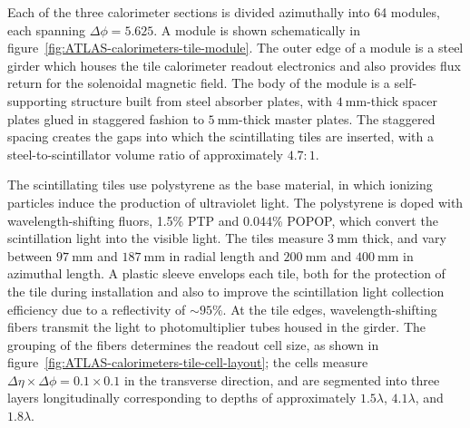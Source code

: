 Each of the three calorimeter sections is divided azimuthally into 64 modules, each spanning $\Delta\phi=5.625$. A module is shown schematically in figure~\ref{fig:ATLAS-calorimeters-tile-module}. The outer edge of a module is a steel girder which houses the tile calorimeter readout electronics and also provides flux return for the solenoidal magnetic field. The body of the module is a self-supporting structure built from steel absorber plates, with $\SI{4}{\milli\meter}$-thick spacer plates glued in staggered fashion to $\SI{5}{\milli\meter}$-thick master plates. The staggered spacing creates the gaps into which the scintillating tiles are inserted, with a steel-to-scintillator volume ratio of approximately $4.7:1$. 

The scintillating tiles use polystyrene as the base material, in which ionizing particles induce the production of ultraviolet light. The polystyrene is doped with wavelength-shifting fluors, 1.5\% PTP and 0.044\% POPOP, which convert the scintillation light into the visible light. The tiles measure $\SI{3}{\milli\meter}$ thick, and vary between $\SI{97}{\milli\meter}$ and $\SI{187}{\milli\meter}$ in radial length and $\SI{200}{\milli\meter}$ and $\SI{400}{\milli\meter}$ in azimuthal length. A plastic sleeve envelops each tile, both for the protection of the tile during installation and also to improve the scintillation light collection efficiency due to a reflectivity of $\sim 95\%$. At the tile edges, wavelength-shifting fibers transmit the light to photomultiplier tubes housed in the girder. The grouping of the fibers determines the readout cell size, as shown in figure~\ref{fig:ATLAS-calorimeters-tile-cell-layout}; the cells measure $\Delta\eta\times\Delta\phi=0.1\times0.1$ in the transverse direction, and are segmented into three layers longitudinally corresponding to depths of approximately $1.5\lambda$, $4.1\lambda$, and $1.8\lambda$.


